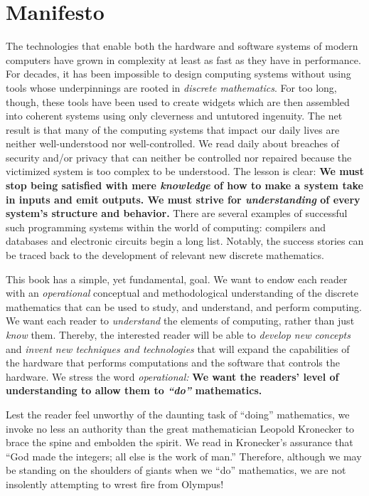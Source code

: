 
\chapter*{Manifesto}

The technologies that enable both the hardware and software systems of modern computers have grown in complexity at least as fast as they have in performance.  For decades, it has been impossible to design computing systems without using tools whose underpinnings are rooted
in {\it discrete mathematics}.  For too long, though, these tools have been used to create widgets which are then assembled into coherent systems using only cleverness and untutored ingenuity.  The net result is that many of the computing systems that impact our daily lives are neither well-understood nor well-controlled.  We read daily about breaches of security and/or privacy that can neither be controlled nor repaired because the victimized system is too complex to be understood.  The lesson is clear: {\bf We must stop being satisfied with mere {\em knowledge} of how to make a system take in inputs and emit outputs.  We must strive for {\em understanding} of every system's structure and behavior.}  There are several examples of successful such programming systems within the world of computing: compilers and databases and electronic circuits begin a long list.  Notably, the success stories can be traced back to the development of relevant new discrete mathematics.

This book has a simple, yet fundamental, goal.  We want to endow each reader with an {\em operational} conceptual and methodological understanding of the discrete mathematics that can be used to study, and understand, and perform computing.  We want each reader to {\em understand} the elements of computing, rather than just {\em know} them.  Thereby, the interested reader will be able to {\em develop new concepts} and {\em invent new techniques and technologies} that will expand the capabilities of the hardware that performs computations and the software that controls the hardware.  We stress the word {\it operational:}  {\bf We want the readers' level of understanding to allow them to {\em ``do''} mathematics.}

\bigskip

Lest the reader feel unworthy of the daunting task of ``doing'' mathematics, we invoke no less an authority than the great mathematician Leopold Kronecker to brace
the spine and embolden the spirit.  We read in \cite{Bell86} Kronecker's assurance that ``God made the integers; all else is the work of man.''  Therefore, although we may be standing on the
shoulders of giants when we ``do'' mathematics, we are not insolently attempting to wrest fire from Olympus!

